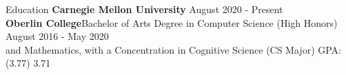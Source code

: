 \documentclass{resume}
\begin{document}
\begin{rSection}{Education}
{\bf Carnegie Mellon University}{ \href{PhD candidate in Software Engineering}{}} \hfill { August 2020 - Present} \\ 
{\bf Oberlin College}{Bachelor of Arts Degree in Computer Science (High Honors)} \hfill { August 2016 - May 2020} \\
and Mathematics, with a Concentration in Cognitive Science \hfill {(CS Major) GPA: (3.77) 3.71} 
\end{rSection}
\end{document}
